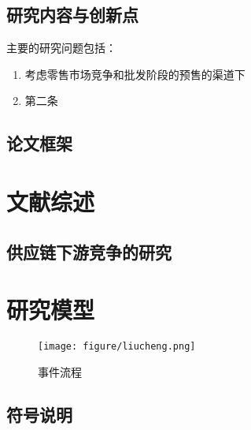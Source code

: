 \documentclass[12pt]{article} %
\numberwithin{equation}{section} %
\begin{document}
\subsection{研究内容与创新点}


主要的研究问题包括：
\begin{enumerate}
	\item 考虑零售市场竞争和批发阶段的预售的渠道下
	\item 第二条
\end{enumerate}




\subsection{论文框架}


\clearpage

\section{文献综述}


\subsection{供应链下游竞争的研究}



\clearpage

\section{研究模型}

\begin{figure}[h]
	\centering
	\caption{事件流程}\label{process} %
	\texttt{[image: figure/liucheng.png]}
\end{figure}

\subsection{符号说明}
\end{document}
